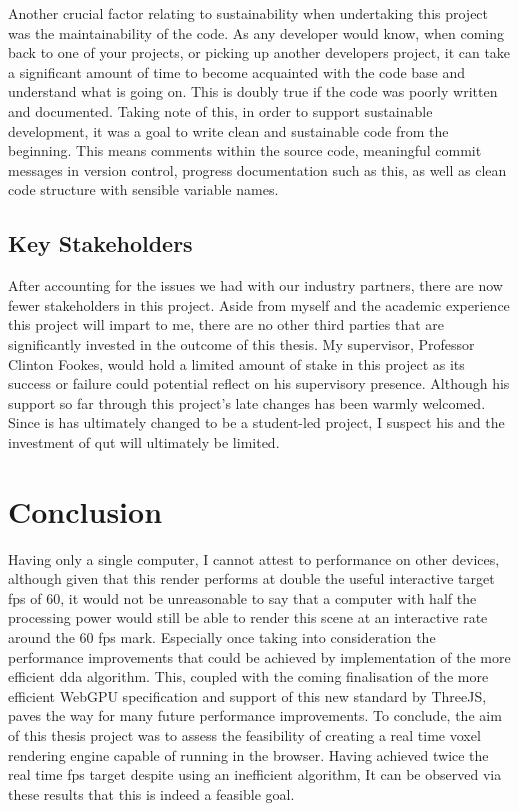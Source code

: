 \documentclass[titlepage]{article}
\begin{document}
Another crucial factor relating to sustainability when undertaking this project was the maintainability of the code. As any developer would know, when coming back to one of your projects, or picking up another developers project, it can take a significant amount of time to become acquainted with the code base and understand what is going on. This is doubly true if the code was poorly written and documented. Taking note of this, in order to support sustainable development, it was a goal to write clean and sustainable code from the beginning. This means comments within the source code, meaningful commit messages in version control, progress documentation such as this, as well as clean code structure with sensible variable names.

\subsection{Key Stakeholders}
After accounting for the issues we had with our industry partners, there are now fewer stakeholders in this project. Aside from myself and the academic experience this project will impart to me, there are no other third parties that are significantly invested in the outcome of this thesis. My supervisor, Professor Clinton Fookes, would hold a limited amount of stake in this project as its success or failure could potential reflect on his supervisory presence. Although his support so far through this project's late changes has been warmly welcomed. Since is has ultimately changed to be a student-led project, I suspect his and the investment of \gls{qut} will ultimately be limited.

\section{Conclusion}

Having only a single computer, I cannot attest to performance on other devices, although given that this render performs at double the useful interactive target \gls{fps} of 60, it would not be unreasonable to say that a computer with half the processing power would still be able to render this scene at an interactive rate around the 60 \gls{fps} mark. Especially once taking into consideration the performance improvements that could be achieved by implementation of the more efficient \gls{dda} algorithm. This, coupled with the coming finalisation of the more efficient WebGPU specification and support of this new standard by ThreeJS, paves the way for many future performance improvements. To conclude, the aim of this thesis project was to assess the feasibility of creating a real time voxel rendering engine capable of running in the browser. Having achieved twice the real time \gls{fps} target despite using an inefficient algorithm, It can be observed via these results that this is indeed a feasible goal.
\end{document}
